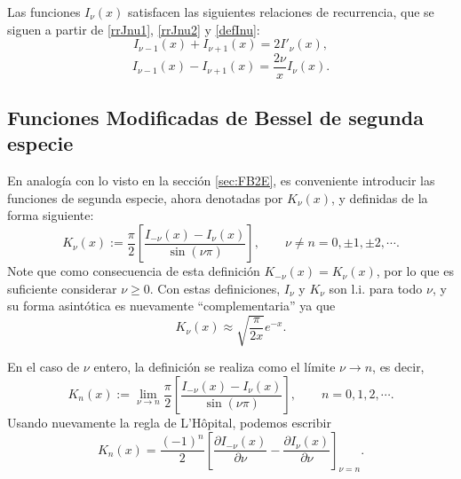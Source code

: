 Las funciones $I_\nu(x)$ satisfacen las siguientes relaciones de recurrencia, que se siguen a partir de \eqref{rrJnu1}, \eqref{rrJnu2} y \eqref{defInu}:
\begin{equation}\label{rrInu1}
I_{\nu-1}(x)+I_{\nu+1}(x)=2I'_\nu(x),
\end{equation}
\begin{equation}\label{rrInu2}
I_{\nu-1}(x)-I_{\nu+1}(x)=\frac{2\nu}{x}I_\nu(x).
\end{equation}

\subsection{Funciones Modificadas de Bessel de segunda especie}
En analogía con lo visto en la sección \ref{sec:FB2E}, es conveniente introducir las funciones de segunda especie, ahora denotadas por $K_\nu(x)$, y definidas de la forma siguiente:
\begin{equation}\label{defKnu}
K_\nu(x) := \frac{\pi}{2}\left[\frac{I_{-\nu}(x)-I_\nu(x)}{\sin(\nu\pi)}\right], \qquad \nu\neq n=0,\pm 1,\pm 2, \cdots.
\end{equation}
Note que como consecuencia de esta definición $K_{-\nu}(x)=K_\nu(x)$, por lo que es suficiente considerar $\nu\ge 0$.
Con estas definiciones, $I_\nu$ y $K_\nu$ son l.i. para todo $\nu$, y su forma asintótica es nuevamente ``complementaria'' ya que
\begin{equation}
K_\nu(x) \approx \sqrt{\frac{\pi}{2x}} e^{-x}.
\end{equation}

En el caso de $\nu$ entero, la definición se realiza como el límite $\nu\to n$, es decir,
\begin{equation}
K_n(x) := \lim_{\nu\to n}\frac{\pi}{2}\left[\frac{I_{-\nu}(x)-I_\nu(x)}{\sin(\nu\pi)}\right], \qquad  n=0,1,2, \cdots.
\end{equation}
Usando nuevamente la regla de L'H\^opital, podemos escribir
\begin{equation}\label{Knder}
K_n(x)=\frac{(-1)^n}{2}\left[\frac{\partial I_{-\nu}(x)}{\partial\nu}-\frac{\partial I_\nu(x)}{\partial\nu}\right]_{\nu=n}.
\end{equation}

